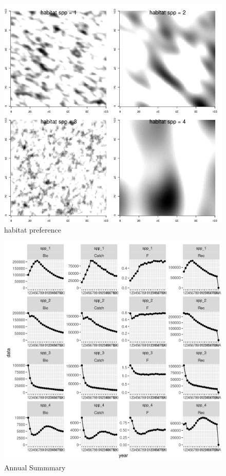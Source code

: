 \documentclass[review]{elsarticle}
\begin{document}
\begin{figure}[!ht]
	\includegraphics[width = \linewidth]{../tests/plots/habitat}
	\caption{habitat preference}
	\label{fig:1}
\end{figure}	

\begin{figure}[!ht]
	\includegraphics[width = \linewidth]{../tests/plots/annual_summary}
	\caption{Annual Summmary}
	\label{fig:2}
\end{figure}	
\end{document}
